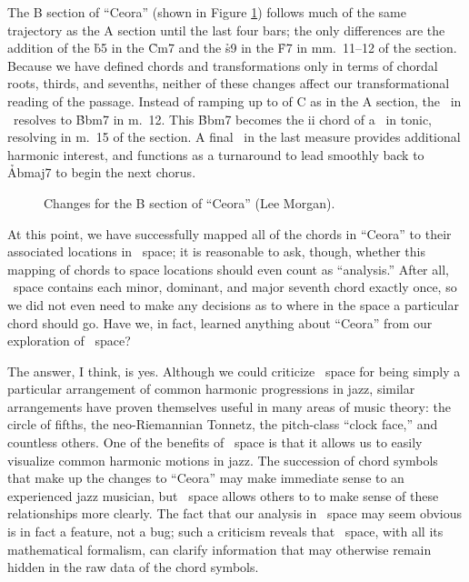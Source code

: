 The B section of ``Ceora'' (shown in Figure \ref{tf:ceora-changes-2}) follows
much of the same trajectory as the A section until the last four bars; the
only differences are the addition of the \h{b5} in the \h{Cm7} and the \h{s9}
in the \h{F7} in mm.~11--12 of the section. Because we have defined chords and
transformations only in terms of chordal roots, thirds, and sevenths, neither
of these changes affect our transformational reading of the passage. Instead
of ramping up to \ii of C as in the A section, the \tf\ in \Bflat\
resolves to \h{Bbm7} in m.~12. This \h{Bbm7} becomes the ii chord of a \tfo\
in tonic, resolving in m.~15 of the section. A final \tf\ in the last measure
provides additional harmonic interest, and functions as a turnaround to lead
smoothly back to \h{Abmaj7} to begin the next chorus.

\begin{figure}[htbp]
  \caption{Changes for the B section of ``Ceora'' (Lee Morgan).}
  \label{tf:ceora-changes-2}
\end{figure}

At this point, we have successfully mapped all of the chords in ``Ceora'' to
their associated locations in \tf\ space; it is reasonable to ask, though,
whether this mapping of chords to space locations should even count as
``analysis.'' After all, \tf\ space contains each minor, dominant, and major
seventh chord exactly once, so we did not even need to make any decisions as
to where in the space a particular chord should go. Have we, in fact, learned
anything about ``Ceora'' from our exploration of \tf\ space?

The answer, I think, is yes. Although we could criticize \tf\ space for being
simply a particular arrangement of common harmonic progressions in jazz,
similar arrangements have proven themselves useful in many areas of music
theory: the circle of fifths, the neo-Riemannian Tonnetz, the pitch-class
``clock face,'' and countless others.\fn{tf-12} One of the benefits of \tf\
space is that it allows us to easily visualize common harmonic motions in jazz. The
succession of chord symbols that make up the changes to ``Ceora'' may make
immediate sense to an experienced jazz musician, but \tf\ space allows others
to to make sense of these relationships more clearly. The fact that our
analysis in \tf\ space may seem obvious is in fact a feature, not a bug; such
a criticism reveals that \tf\ space, with all its mathematical formalism,
can clarify information that may otherwise remain hidden in the raw data of
the chord symbols.\fn{tf-13}

